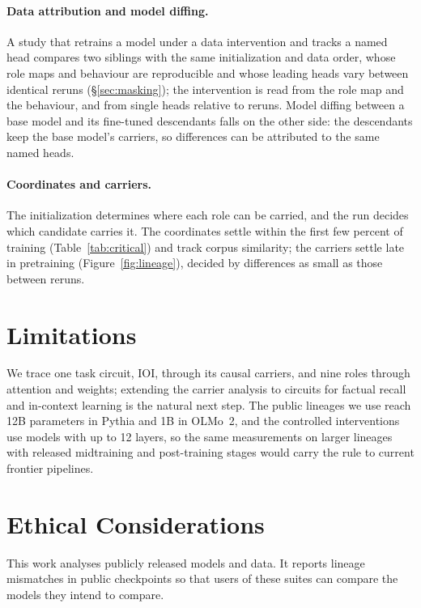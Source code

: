 \documentclass[11pt]{article}
\begin{document}
\paragraph{Data attribution and model diffing.}
A study that retrains a model under a data intervention and tracks a named head compares two siblings with the same initialization and data order, whose role maps and behaviour are reproducible and whose leading heads vary between identical reruns (\S\ref{sec:masking}); the intervention is read from the role map and the behaviour, and from single heads relative to reruns.
Model diffing between a base model and its fine-tuned descendants falls on the other side: the descendants keep the base model's carriers, so differences can be attributed to the same named heads.

\paragraph{Coordinates and carriers.}
The initialization determines where each role can be carried, and the run decides which candidate carries it.
The coordinates settle within the first few percent of training (Table~\ref{tab:critical}) and track corpus similarity; the carriers settle late in pretraining (Figure~\ref{fig:lineage}), decided by differences as small as those between reruns.

\section*{Limitations}
We trace one task circuit, IOI, through its causal carriers, and nine roles through attention and weights; extending the carrier analysis to circuits for factual recall and in-context learning is the natural next step.
The public lineages we use reach 12B parameters in Pythia and 1B in OLMo~2, and the controlled interventions use models with up to 12 layers, so the same measurements on larger lineages with released midtraining and post-training stages would carry the rule to current frontier pipelines.

\section*{Ethical Considerations}
This work analyses publicly released models and data. It reports lineage mismatches in public checkpoints so that users of these suites can compare the models they intend to compare.


\end{document}
